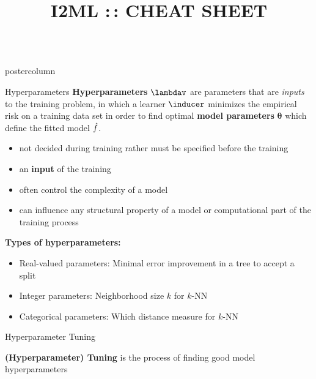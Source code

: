 \documentclass{beamer}
\title{I2ML :\,: CHEAT SHEET} %
\newlength{\columnheight} %
\begin{document}
\begin{frame}[fragile]{}
\begin{columns}
	\begin{column}{.31\textwidth}
		\begin{beamercolorbox}[center]{postercolumn}
			\begin{minipage}{.98\textwidth}
				\parbox[t][\columnheight]{\textwidth}{
					\begin{myblock}{Hyperparameters}
						\textbf{Hyperparameters} $\lambdav$ are parameters that are \emph{inputs} to the training problem, in which a learner $\inducer$ minimizes the empirical risk on a training data set in order to find optimal \textbf{model parameters} $\bm{\theta}$ which define the fitted model $\hat{f}$.
						\begin{itemize}[$\bullet$]     
            \setlength{\itemindent}{+.3in}
                        \item not decided during training rather must be specified before the training
                        \item an \textbf{input} of the training
                        \item often control the complexity of a model
                        \item can influence any structural property of a model or computational part of the training process
                        \end{itemize}

						\begin{codebox}
			\textbf{Types of hyperparameters: }
						\end{codebox}
						\begin{itemize}[$\bullet$]     
            \setlength{\itemindent}{+.3in}
						    \item Real-valued parameters: Minimal error improvement in a tree to accept a split
						    \item Integer parameters: Neighborhood size $k$ for $k$-NN
						    \item Categorical parameters: Which distance measure for $k$-NN
						\end{itemize}
						\end{myblock}

						\begin{myblock}{Hyperparameter Tuning}

\textbf{(Hyperparameter) Tuning} is the process of finding good model hyperparameters


\end{myblock}}
\end{minipage}
\end{beamercolorbox}
\end{column}
\end{columns}
\end{frame}
\end{document}
